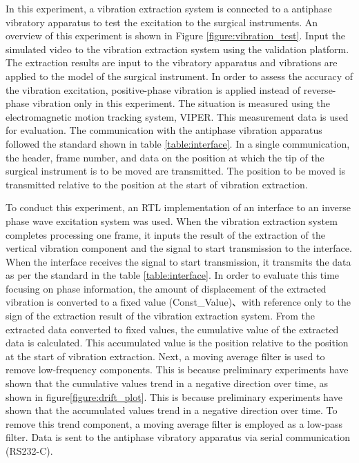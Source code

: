 In this experiment, a vibration extraction system is connected
to a antiphase vibratory apparatus to test the excitation to the surgical instruments.
An overview of this experiment is shown in Figure \ref{figure:vibration_test}.
Input the simulated video to the vibration extraction system using the validation platform.
The extraction results are input to the vibratory apparatus and vibrations are applied to the model of the surgical instrument.
In order to assess the accuracy of the vibration excitation, positive-phase vibration is applied instead of reverse-phase vibration only in this experiment.
The situation is measured using the electromagnetic motion tracking system, VIPER\cite{bib:VIPER}.
This measurement data is used for evaluation.
The communication with the antiphase vibration apparatus followed the
standard shown in table \ref{table:interface}.
In a single communication, the header, frame number,
and data on the position at which the tip of the surgical instrument is
to be moved are transmitted.
The position to be moved is transmitted relative to the position
at the start of vibration extraction.

To conduct this experiment, an RTL implementation of an interface
to an inverse phase wave excitation system was used.
When the vibration extraction system completes processing one frame,
it inputs the result of the extraction of the vertical vibration
component and the signal to start transmission to the interface.
When the interface receives the signal to start transmission,
it transmits the data as per the standard in the table \ref{table:interface}.
In order to evaluate this time focusing on phase information, the amount of displacement of the extracted vibration is converted to a fixed value (Const\_Value)、with reference only to the sign of
the extraction result of the vibration extraction system.
From the extracted data converted to fixed values,
the cumulative value of the extracted data is calculated.
This accumulated value is the position relative to the position at the start of vibration extraction.
Next, a moving average filter is used to remove low-frequency components.
This is because preliminary experiments have shown that the cumulative values trend
in a negative direction over time, as shown in figure\ref{figure:drift_plot}.
This is because preliminary experiments have shown that the accumulated values trend
in a negative direction over time.
To remove this trend component, a moving average filter is employed as a low-pass filter.
Data is sent to the antiphase vibratory apparatus via serial communication (RS232-C).


